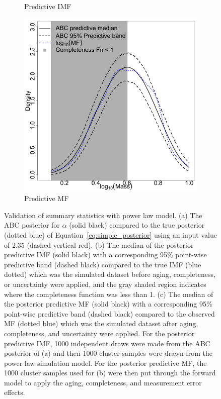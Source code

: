 \documentclass[ejs]{imsart}
\numberwithin{equation}{section}
\theoremstyle{plain}
\begin{document}
\begin{figure}[htbp]
\begin{subfigure}{0.32\textwidth}
\caption{Predictive IMF}\label{subfig:basic_imf}
\end{subfigure}
\begin{subfigure}{0.32\textwidth}
\centering
\includegraphics[width=\textwidth]{figures/basic_1_1000_predictive_mf.png}
\caption{Predictive MF}\label{subfig:basic_mf}
\end{subfigure}        
   \caption{Validation of summary statistics with power law model.  (a) The ABC posterior for $\alpha$ (solid black) compared to the true posterior (dotted blue) of Equation~\eqref{eq:simple_posterior} using an input value of 2.35 (dashed vertical red).  (b) The median of the posterior predictive IMF (solid black) with a corresponding 95\% point-wise predictive band (dashed black) compared to the true IMF (blue dotted) which was the simulated dataset before aging, completeness, or uncertainty were applied, and the gray shaded region indicates where the completeness function was less than 1.  (c) The median of the posterior predictive MF (solid black) with a corresponding 95\% point-wise predictive band (dashed black) compared to the observed MF (dotted blue) which was the simulated dataset after aging, completeness, and uncertainty were applied.  For the posterior predictive IMF, 1000 independent draws were made from the ABC posterior of (a) and then 1000 cluster samples were drawn from the power law simulation model.  For the posterior predictive MF, the 1000 cluster samples used for (b) were then put through the forward model to apply the aging, completeness, and measurement error effects.
} \label{fig:abc_simple}
\end{figure}
\end{document}
